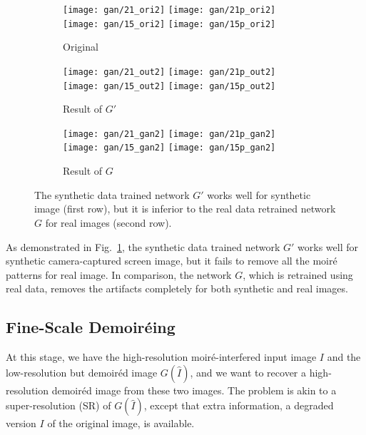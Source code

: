 \documentclass[10pt,twocolumn,letterpaper]{article}
\begin{document}
\begin{figure}
  \centering
  \begin{subfigure}{0.32\linewidth}
    \texttt{[image: gan/21\_ori2]}
    \texttt{[image: gan/21p\_ori2]}
    \\[1ex]
    \texttt{[image: gan/15\_ori2]}
    \texttt{[image: gan/15p\_ori2]}
    \caption{Original}
  \end{subfigure}
  \begin{subfigure}{0.32\linewidth}
    \texttt{[image: gan/21\_out2]}
    \texttt{[image: gan/21p\_out2]}
    \\[1ex]
    \texttt{[image: gan/15\_out2]}
    \texttt{[image: gan/15p\_out2]}
    \caption{Result of $G'$}
  \end{subfigure}
  \begin{subfigure}{0.32\linewidth}
    \texttt{[image: gan/21\_gan2]}
    \texttt{[image: gan/21p\_gan2]}
    \\[1ex]
    \texttt{[image: gan/15\_gan2]}
    \texttt{[image: gan/15p\_gan2]}
    \caption{Result of $G$}
  \end{subfigure}

  \caption{The synthetic data trained network $G'$ works well for
    synthetic image (first row), but it is inferior to the real data
    retrained network $G$ for real images (second row).}
  \label{fig:exp_gan}
\end{figure}

As demonstrated in Fig.~\ref{fig:exp_gan}, the synthetic data trained
network $G'$ works well for synthetic camera-captured screen image,
but it fails to remove all the moir\'e patterns for real image.  In
comparison, the network $G$, which is retrained using real data,
removes the artifacts completely for both synthetic and real images.

\subsection{Fine-Scale Demoir\'eing}
\label{sec:superres}

At this stage, we have the high-resolution moir\'e-interfered input
image $I$ and the low-resolution but demoir\'ed image $G(\hat{I})$,
and we want to recover a high-resolution demoir\'ed image from these
two images.  The problem is akin to a super-resolution (SR) of
$G(\hat{I})$, except that extra information, a degraded version $I$ of
the original image, is available.
\end{document}
